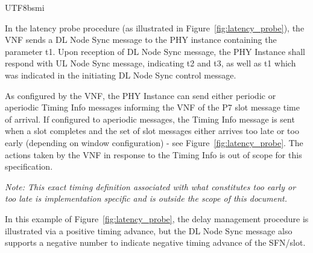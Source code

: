 \documentclass[conference]{IEEEtran}
\begin{document}
\begin{CJK}{UTF8}{bsmi}
{In the latency probe procedure (as illustrated in Figure~\ref{fig:latency_probe}), the VNF sends a DL Node Sync message to the PHY instance containing the parameter t1. Upon reception of DL Node Sync message, the PHY Instance shall respond with UL Node Sync message, indicating t2 and t3, as well as t1 which was indicated in the initiating DL Node Sync control message.

As configured by the VNF, the PHY Instance can send either periodic or aperiodic Timing Info messages informing the VNF of the P7 slot message time of arrival. If configured to aperiodic messages, the Timing Info message is sent when a slot completes and the set of slot messages either arrives too late or too early (depending on window configuration) - see Figure~\ref{fig:latency_probe}. The actions taken by the VNF in response to the Timing Info is out of scope for this specification.

\textit{Note: This exact timing definition associated with what constitutes too early or too late is implementation specific and is outside the scope of this document.}

In this example of Figure~\ref{fig:latency_probe}, the delay management procedure is illustrated via a positive timing advance, but the DL Node Sync message also supports a negative number to indicate negative timing advance of the SFN/slot.
}

\begin{figure}[htbp]
\centering
{}
\end{figure}
\end{CJK}
\end{document}
